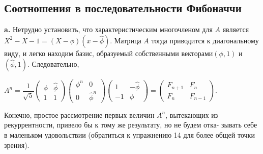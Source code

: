 \documentclass{mai_book}
\begin{document}
\subsection{Соотношения в последовательности Фибоначчи}
\hspace*{15pt}\textbf{a.} Нетрудно установить, что характеристическим многочленом для
$A$ является $X^2-X-1=(X-\phi)(x-\hat{\phi})$. Матрица $A$ тогда приводится к
диагональному виду, и легко находим базис, образуемый собственными
векторами$(\phi,1)$ и $(\hat{\phi},1)$. Следовательно,\newline
\begin{center}
$A^n=\dfrac{1}{\sqrt{5}}\begin{pmatrix} \phi & \hat{\phi} \\ 1 & 1 \end{pmatrix}\begin{pmatrix} \phi^n & 0 \\ 0 & \hat{\phi}^n \end{pmatrix} \begin{pmatrix} 1 & -\hat{\phi} \\ -1 & \phi \end{pmatrix} = \begin{pmatrix} F_{n+1} & F_{n} \\ F_{n} & F_{n-1} \end{pmatrix}$.
\end{center}
Конечно, простое рассмотрение первых величин $A^n$, вытекающих из
рекуррентности, привело бы к тому же результату, но не будем отка-
зывать себе в маленьком удовольствии (обратиться к упражнению 14
для более общей точки зрения).
\newpage
\end{document}
